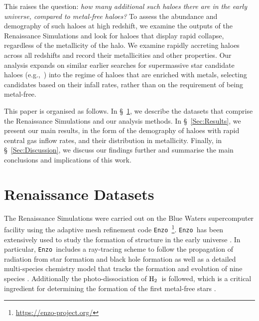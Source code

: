 \documentclass[twocolumn,iop,revtex4]{openjournal}
\newcommand{\enzo}{\texttt{Enzo~}}
\newcommand{\molH} {$\rm{H_2}$~}
\begin{document}
This raises the question: {\em how many additional such haloes there are in the early universe, compared to metal-free haloes?}
To assess the abundance and demography of such haloes at high redshift, we examine the outputs of the Renaissance Simulations
and look for haloes that display rapid collapse, regardless of the metallicity of the halo.
We examine rapidly accreting haloes across all redshifts and record their metallicities and other properties.
Our analysis expands on similar earlier searches for supermassive star candidate haloes
(e.g.,~\citealt{Habouzit_2016,Tremmel_2017,Dunn_2018,Wise_2019,Regan_2020}) into the regime of haloes that are enriched with
metals, selecting candidates based on their infall rates, rather than on the requirement of being metal-free.

This paper is organised as follows.
In \S~\ref{Sec:RenaissanceDatasets}, we describe the datasets that comprise the Renaissance Simulations
and our analysis methods.
In \S~\ref{Sec:Results}, we present  our main results, in the form of the demography of
haloes with rapid central gas inflow rates, and their distribution in metallicity.  
Finally, in \S~\ref{Sec:Discussion}, 
we discuss our findings further and summarise the main conclusions and implications of this work.

\section{Renaissance Datasets} \label{Sec:RenaissanceDatasets}
The Renaissance Simulations were carried out on the Blue Waters supercomputer facility using the
adaptive mesh refinement code \enzo\citep{Enzo_2014, Enzo_2019}\footnote{\url{https://enzo-project.org/}}.
\enzo has been extensively used to study the formation of structure in the early universe
\citep{Abel_2002, OShea_2005b, Turk_2012, Wise_2012b, Wise_2014, Regan_2015, Regan_2017}. In
particular, \enzo includes a ray-tracing scheme to follow the propagation of radiation from star
formation and
black hole formation \citep{WiseAbel_2011} as well as a detailed multi-species chemistry model that
tracks the formation and evolution of nine species \citep{Anninos_1997, Abel_1997, Grackle}.
Additionally the photo-dissociation of \molH is followed, which is a critical ingredient for
determining the formation of the first metal-free stars \citep{Haiman_2000}.
\end{document}
